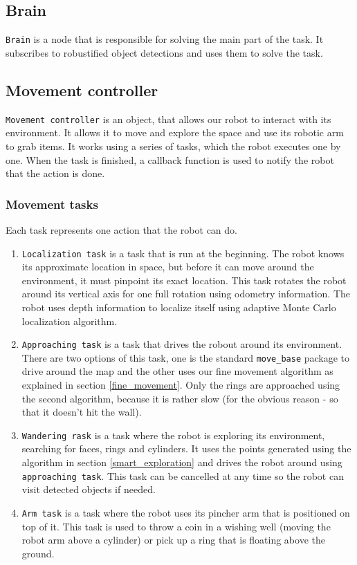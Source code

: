 \documentclass[12pt,a4paper]{article}
\begin{document}
	\subsection{Brain}
	\texttt{Brain} is a node that is responsible for solving the main part of the task. It subscribes to robustified object detections and uses them to solve the task. \\
	
	
	\subsection{Movement controller}
	\texttt{Movement controller} is an object, that allows our robot to interact with its environment. It allows it to move and explore the space and use its robotic arm to grab items. It works using a series of tasks, which the robot executes one by one. When the task is finished, a callback function is used to notify the robot that the action is done. \\

	\subsubsection{Movement tasks}
	Each task represents one action that the robot can do.

	\begin{enumerate}
		\item \texttt{Localization task} is a task that is run at the beginning. The robot knows its approximate location in space, but before it can move around the environment, it must pinpoint its exact location. This task rotates the robot around its vertical axis for one full rotation using odometry information. The robot uses depth information to localize itself using adaptive Monte Carlo localization algorithm.
		\item \texttt{Approaching task} is a task that drives the robout around its environment. There are two options of this task, one is the standard \texttt{move\_base} package to drive around the map and the other uses our fine movement algorithm as explained in section \ref{fine_movement}. Only the rings are approached using the second algorithm, because it is rather slow (for the obvious reason - so that it doesn't hit the wall).
		\item \texttt{Wandering rask} is a task where the robot is exploring its environment, searching for faces, rings and cylinders. It uses the points generated using the algorithm in section \ref{smart_exploration} and drives the robot around using \texttt{approaching task}. This task can be cancelled at any time so the robot can visit detected objects if needed.
		\item \texttt{Arm task} is a task where the robot uses its pincher arm that is positioned on top of it. This task is used to throw a coin in a wishing well (moving the robot arm above a cylinder) or pick up a ring that is floating above the ground.
	\end{enumerate}
\end{document}
